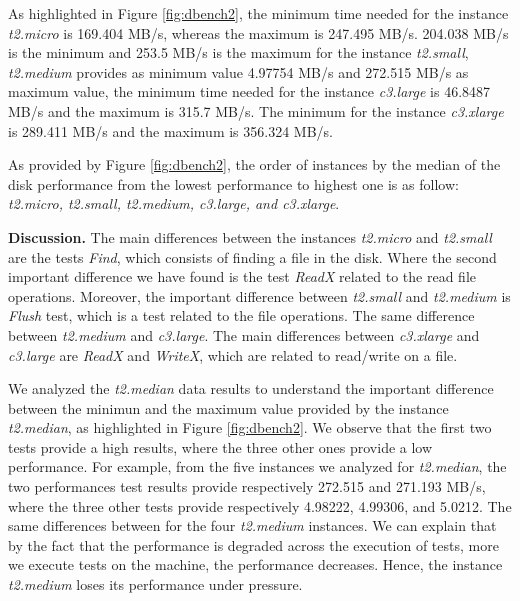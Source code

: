 \documentclass[10pt, conference]{IEEEtran}
\begin{document}
As highlighted in Figure \ref{fig:dbench2}, the minimum time needed for the instance \textit{t2.micro} is 169.404 MB/s, whereas the maximum is 247.495 MB/s. 204.038 MB/s is the minimum and 253.5 MB/s is the maximum for the instance \textit{t2.small}, \textit{t2.medium} provides as minimum value 4.97754 MB/s and 272.515 MB/s as maximum value, the minimum time needed for the instance \textit{c3.large} is 46.8487 MB/s and the maximum is 315.7 MB/s. The minimum for the instance \textit{c3.xlarge} is 289.411 MB/s and the maximum is 356.324 MB/s.

As provided by Figure \ref{fig:dbench2}, the order of instances by the median of the disk performance from the lowest performance to highest one is as follow: \textit{t2.micro, t2.small, t2.medium, c3.large, and c3.xlarge}.

\textbf{Discussion.} The main differences between the instances \textit{t2.micro} and \textit{t2.small} are the tests \textit{Find}, which consists of finding a file in the disk. Where the second important difference we have found is the test \textit{ReadX} related to the read file operations. Moreover, the important difference between \textit{t2.small} and \textit{t2.medium} is \textit{Flush} test, which is a test related to the file operations. The same difference between \textit{t2.medium} and \textit{c3.large}. The main differences between \textit{c3.xlarge} and \textit{c3.large} are \textit{ReadX} and \textit{WriteX}, which are related to read/write on a file.


We analyzed the \textit{t2.median} data results to understand the important difference between the minimun and the maximum value provided by the instance \textit{t2.median}, as highlighted in Figure \ref{fig:dbench2}. We observe that the first two tests provide a high results, where the three other ones provide a low performance. For example, from the five instances we analyzed for \textit{t2.median}, the two performances test results provide respectively 272.515 and 271.193 MB/s, where the three other tests provide respectively 4.98222, 4.99306, and 5.0212. The same differences between for the four \textit{t2.medium} instances. We can explain that by the fact that the performance is degraded across the execution of tests, more we execute tests on the machine, the performance decreases. Hence, the instance \textit{t2.medium} loses its performance under pressure.  

\

\noindent{}
\end{document}
